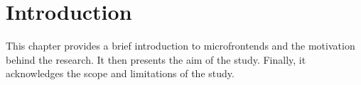 \chapter{Introduction}
\label{chap:Introduction} 
This chapter provides a brief introduction to microfrontends and the motivation behind the research. It then presents the aim of the study. Finally, it acknowledges the scope and limitations of the study.



